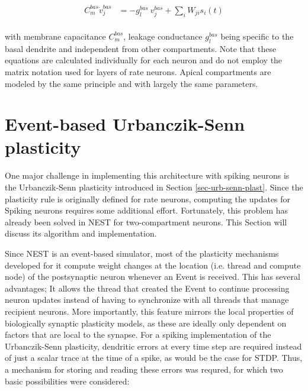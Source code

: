 \begin{align}
  C_m^{bas} \dot{v}_j^{bas} & = -g_l^{bas} \  v_j^{bas} + \sum_i W_{ji} s_i(t)     \label{eq-spiking-basal-compartment} \\
\end{align}

with membrane capacitance $C_m^{bas}$, leakage conductance $g_l^{bas}$ being specific to the basal dendrite and
independent from other compartments. Note that these equations are calculated individually for each neuron and do not
employ the matrix notation used for layers of rate neurons. Apical compartments are modeled by the same principle and
with largely the same parameters.

\section{Event-based Urbanczik-Senn plasticity}\label{sec-event-urb}

One major challenge in implementing this architecture with spiking neurons is the Urbanczik-Senn plasticity introduced
in Section \ref{sec-urb-senn-plast}. Since the plasticity rule is originally defined for rate neurons, computing the
updates for Spiking neurons requires some additional effort. Fortunately, this problem has already been solved in NEST
\citep{Stapmanns2021} for two-compartment neurons. This Section will discuss its algorithm and implementation. \newline

Since NEST is an event-based simulator, most of the plasticity mechanisms developed for it compute weight changes at the
location (i.e. thread and compute node) of the postsynaptic neuron whenever an Event is received. This has several
advantages; It allows the thread that created the Event to continue processing neuron updates instead of having to
synchronize with all threads that manage recipient neurons.  More importantly, this feature mirrors the local properties
of biologically synaptic plasticity models, as these are ideally only dependent on factors that are local to the
synapse. For a spiking implementation of the Urbanczik-Senn plasticity, dendritic errors at every time step are required
instead of just a scalar trace at the time of a spike, as would be the case for STDP. Thus, a mechanism for storing and
reading these errors was requred, for which two basic possibilities were considered:


